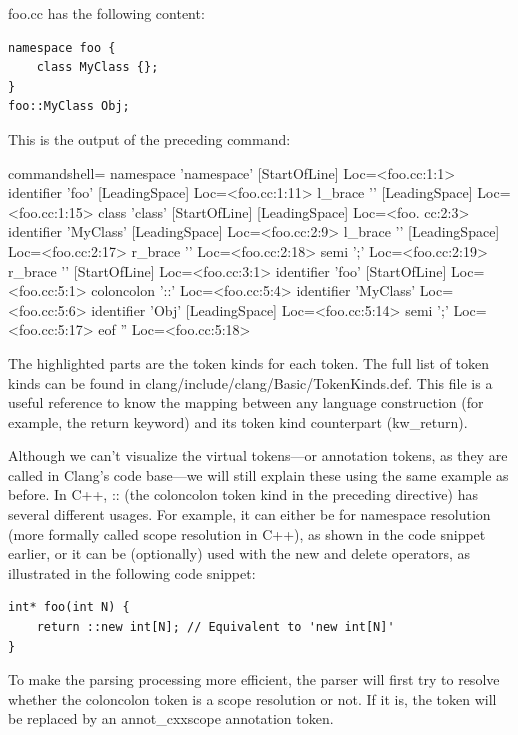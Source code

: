 
foo.cc has the following content:

\begin{lstlisting}[style=styleCXX]
namespace foo {
	class MyClass {};
}
foo::MyClass Obj;
\end{lstlisting}

This is the output of the preceding command:

\begin{tcblisting}{commandshell={}}
namespace 'namespace' [StartOfLine] Loc=<foo.cc:1:1>
identifier 'foo' [LeadingSpace] Loc=<foo.cc:1:11>
l_brace '{' [LeadingSpace] Loc=<foo.cc:1:15>
class 'class' [StartOfLine] [LeadingSpace] Loc=<foo.
cc:2:3>
identifier 'MyClass' [LeadingSpace] Loc=<foo.cc:2:9>
l_brace '{' [LeadingSpace] Loc=<foo.cc:2:17>
	r_brace '}' Loc=<foo.cc:2:18>
semi ';' Loc=<foo.cc:2:19>
r_brace '}' [StartOfLine] Loc=<foo.cc:3:1>
identifier 'foo' [StartOfLine] Loc=<foo.cc:5:1>
coloncolon '::' Loc=<foo.cc:5:4>
identifier 'MyClass' Loc=<foo.cc:5:6>
identifier 'Obj' [LeadingSpace] Loc=<foo.cc:5:14>
semi ';' Loc=<foo.cc:5:17>
eof '' Loc=<foo.cc:5:18>
\end{tcblisting}

The highlighted parts are the token kinds for each token. The full list of token kinds can be found in clang/include/clang/Basic/TokenKinds.def. This file is a useful reference to know the mapping between any language construction (for example, the return keyword) and its token kind counterpart (kw\_return).

Although we can't visualize the virtual tokens—or annotation tokens, as they are called in Clang's code base—we will still explain these using the same example as before. In C++, :: (the coloncolon token kind in the preceding directive) has several different usages. For example, it can either be for namespace resolution (more formally called scope resolution in C++), as shown in the code snippet earlier, or it can be (optionally) used with the new and delete operators, as illustrated in the following code snippet:

\begin{lstlisting}[style=styleCXX]
int* foo(int N) {
	return ::new int[N]; // Equivalent to 'new int[N]'
}
\end{lstlisting}

To make the parsing processing more efficient, the parser will first try to resolve whether the coloncolon token is a scope resolution or not. If it is, the token will be replaced by an annot\_cxxscope annotation token.
 
